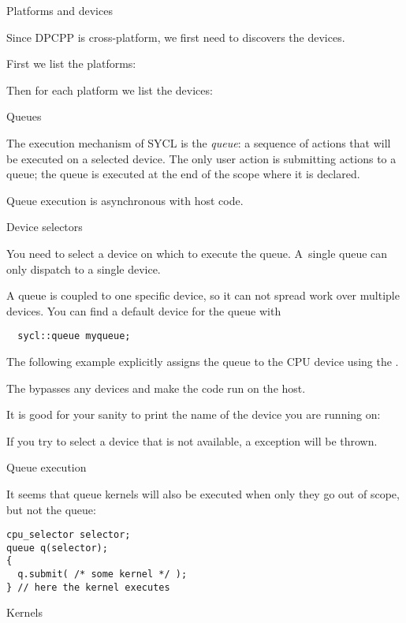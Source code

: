  {Platforms and devices}

Since \ac{DPCPP} is cross-platform, we first need to discovers
the devices.

First we list the platforms:

Then for each platform we list the devices:

 {Queues}

The execution mechanism of SYCL is the
\emph{queue}:
a sequence of actions that will be executed on a selected device.
The only user action is submitting actions to a queue;
the queue is executed at the end of the scope where it is declared.

Queue execution is asynchronous with host code.

 {Device selectors}

You need to select a device on which to execute the queue.
A~single queue can only dispatch to a single device.

A queue is coupled to one specific device,
so it can not spread work over multiple devices.
You can find a default device for the queue with
\begin{lstlisting}
  sycl::queue myqueue;
\end{lstlisting}

The following example explicitly assigns the queue to the CPU device
using the .

The  bypasses any devices and
make the code run on the host.

It is good for your sanity to print the name of the device
you are running on:

If you try to select a device that is not available,
a  exception will be thrown.

 {Queue execution}

It seems that queue kernels will also be executed when only they
go out of scope, but not the queue:
\begin{lstlisting}
cpu_selector selector;
queue q(selector);
{
  q.submit( /* some kernel */ );
} // here the kernel executes
\end{lstlisting}

 {Kernels}


